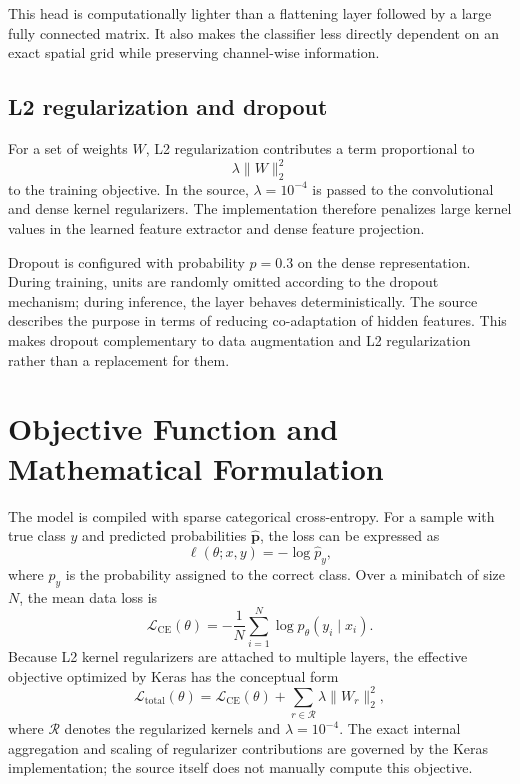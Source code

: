 \documentclass[11pt,a4paper]{article}
\begin{document}
This head is computationally lighter than a flattening layer followed by a large fully connected matrix. It also makes the classifier less directly dependent on an exact spatial grid while preserving channel-wise information.

\subsection{L2 regularization and dropout}
For a set of weights $W$, L2 regularization contributes a term proportional to
\begin{equation}
\lambda \lVert W\rVert_2^2
\end{equation}
to the training objective. In the source, $\lambda=10^{-4}$ is passed to the convolutional and dense kernel regularizers. The implementation therefore penalizes large kernel values in the learned feature extractor and dense feature projection.

Dropout is configured with probability $p=0.3$ on the dense representation. During training, units are randomly omitted according to the dropout mechanism; during inference, the layer behaves deterministically. The source describes the purpose in terms of reducing co-adaptation of hidden features. This makes dropout complementary to data augmentation and L2 regularization rather than a replacement for them.

\section{Objective Function and Mathematical Formulation}
The model is compiled with sparse categorical cross-entropy. For a sample with true class $y$ and predicted probabilities $\hat{\mathbf p}$, the loss can be expressed as
\begin{equation}
\ell(\theta;x,y) = -\log\hat{p}_{y},
\end{equation}
where $\hat{p}_{y}$ is the probability assigned to the correct class. Over a minibatch of size $N$, the mean data loss is
\begin{equation}
\mathcal{L}_{\mathrm{CE}}(\theta)
=
-\frac{1}{N}\sum_{i=1}^{N}\log p_{\theta}(y_i\mid x_i).
\end{equation}
Because L2 kernel regularizers are attached to multiple layers, the effective objective optimized by Keras has the conceptual form
\begin{equation}
\mathcal{L}_{\mathrm{total}}(\theta)
=
\mathcal{L}_{\mathrm{CE}}(\theta)
+
\sum_{r\in\mathcal{R}}\lambda\lVert W_r\rVert_2^2,
\end{equation}
where $\mathcal{R}$ denotes the regularized kernels and $\lambda=10^{-4}$. The exact internal aggregation and scaling of regularizer contributions are governed by the Keras implementation; the source itself does not manually compute this objective.
\end{document}
